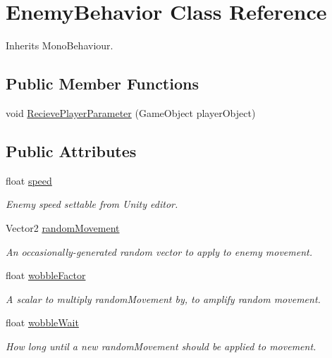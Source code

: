\hypertarget{class_enemy_behavior}{}\section{Enemy\+Behavior Class Reference}
\label{class_enemy_behavior}


Inherits Mono\+Behaviour.

\subsection*{Public Member Functions}
\begin{DoxyCompactItemize}
\item 
void \mbox{\hyperlink{class_enemy_behavior_a1a0d6efe8ce9e53a0e4bddd06c379097}{Recieve\+Player\+Parameter}} (Game\+Object player\+Object)
\end{DoxyCompactItemize}
\subsection*{Public Attributes}
\begin{DoxyCompactItemize}
\item 
\mbox{\label{class_enemy_behavior_a1c7f38d162cec582d736b2b7d7d0ac6b}} 
float \mbox{\hyperlink{class_enemy_behavior_a1c7f38d162cec582d736b2b7d7d0ac6b}{speed}}
\begin{DoxyCompactList}\small\item\em Enemy speed settable from Unity editor. \end{DoxyCompactList}\item 
\mbox{\label{class_enemy_behavior_a6f9339ebbcc8c5ad4e538d52bfde73c1}} 
Vector2 \mbox{\hyperlink{class_enemy_behavior_a6f9339ebbcc8c5ad4e538d52bfde73c1}{random\+Movement}}
\begin{DoxyCompactList}\small\item\em An occasionally-\/generated random vector to apply to enemy movement. \end{DoxyCompactList}\item 
\mbox{\label{class_enemy_behavior_a80484f747dfb85a8063a50dd115f65e0}} 
float \mbox{\hyperlink{class_enemy_behavior_a80484f747dfb85a8063a50dd115f65e0}{wobble\+Factor}}
\begin{DoxyCompactList}\small\item\em A scalar to multiply random\+Movement by, to amplify random movement. \end{DoxyCompactList}\item 
\mbox{\label{class_enemy_behavior_ade5bcff77085ea22523d28312c252d75}} 
float \mbox{\hyperlink{class_enemy_behavior_ade5bcff77085ea22523d28312c252d75}{wobble\+Wait}}
\begin{DoxyCompactList}\small\item\em How long until a new random\+Movement should be applied to movement. \end{DoxyCompactList}\end{DoxyCompactItemize}


